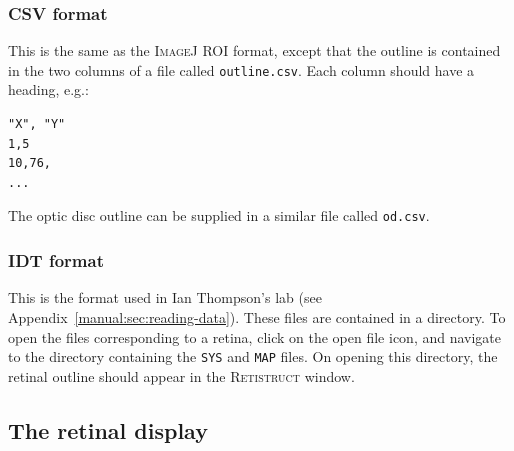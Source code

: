 \documentclass{article}
\begin{document}
\subsubsection{CSV format}
\label{retistruct-manual:sec:csv-format}

This is the same as the \textsc{ImageJ ROI} format, except that the
outline is contained in the two columns of a file called
\texttt{outline.csv}.  Each column should have a heading, e.g.:
\begin{verbatim}
"X", "Y"
1,5
10,76,
...
\end{verbatim}
The optic disc outline can be supplied in a similar file called
\texttt{od.csv}.

\subsubsection{IDT format}
\label{retistruct-manual:sec:idt-format}

This is the format used in Ian Thompson's lab (see
Appendix~\ref{manual:sec:reading-data}). These files are contained in
a directory. To open the files corresponding to a retina, click on the
open file icon, and navigate to the directory containing the
\texttt{SYS} and \texttt{MAP} files. On opening this directory, the
retinal outline should appear in the \textsc{Retistruct} window.


\subsection{The retinal display}
\label{manual:sec:retinal-display}
\end{document}
